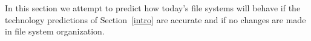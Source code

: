 In this section we attempt to predict how today's file systems
will behave if the technology predictions of Section~\ref{intro}
are accurate
and if no changes are made in file system organization.  
%
% 
% 
% 
